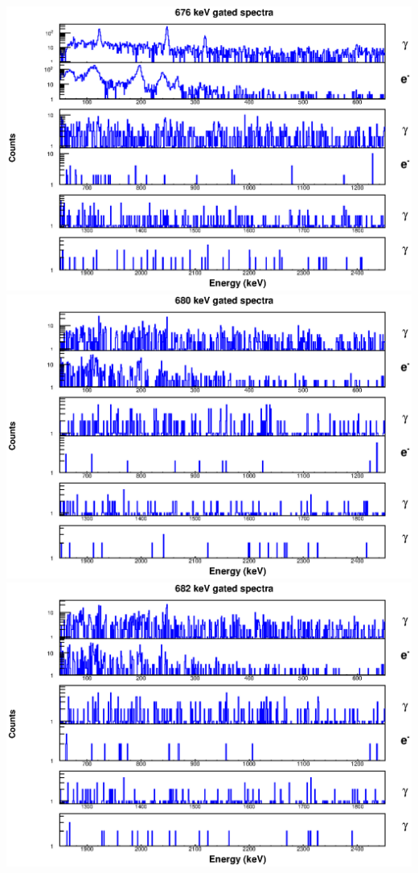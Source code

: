 \includegraphics[scale=0.8]{154Gd_Appendix/676_combined.eps}
\includegraphics[scale=0.8]{154Gd_Appendix/680_combined.eps}
\includegraphics[scale=0.8]{154Gd_Appendix/682_combined.eps}
